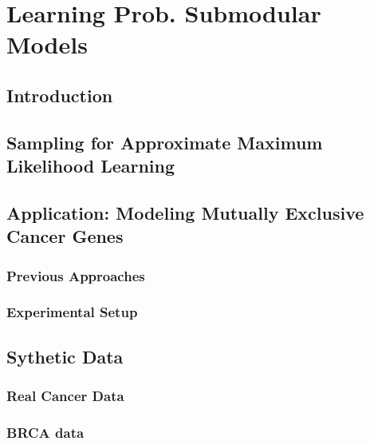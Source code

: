 \chapter{Learning Prob. Submodular Models} \label{ch:genes}

\section{Introduction}

\section{Sampling for Approximate Maximum Likelihood Learning}

\section{Application: Modeling Mutually Exclusive Cancer Genes}
\subsection{Previous Approaches}
\subsection{Experimental Setup}

\section{Sythetic Data}
\subsection{Real Cancer Data}

\subsection{BRCA data}

